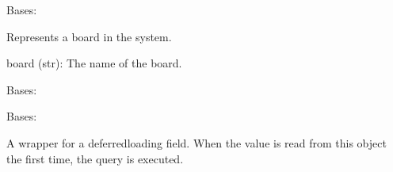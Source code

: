 \documentclass[letterpaper,10pt,english]{sphinxmanual}
\begin{document}
\begin{fulllineitems}
\label{\detokenize{app:app.models.boards}}
\pysigstartsignatures
{}
\pysigstopsignatures
\sphinxAtStartPar
Bases: 

\sphinxAtStartPar
Represents a board in the system.
\begin{description}
\sphinxAtStartPar
board (str): The name of the board.

\end{description}

\begin{fulllineitems}
\label{\detokenize{app:app.models.boards.DoesNotExist}}
\pysigstartsignatures
{}
\pysigstopsignatures
\sphinxAtStartPar
Bases: 

\end{fulllineitems}


\begin{fulllineitems}
\label{\detokenize{app:app.models.boards.MultipleObjectsReturned}}
\pysigstartsignatures
{}
\pysigstopsignatures
\sphinxAtStartPar
Bases: 

\end{fulllineitems}


\begin{fulllineitems}
\label{\detokenize{app:app.models.boards.board}}
\pysigstartsignatures
{}
\pysigstopsignatures
\sphinxAtStartPar
A wrapper for a deferred\sphinxhyphen{}loading field. When the value is read from this
object the first time, the query is executed.


\end{fulllineitems}
\end{fulllineitems}
\end{document}
